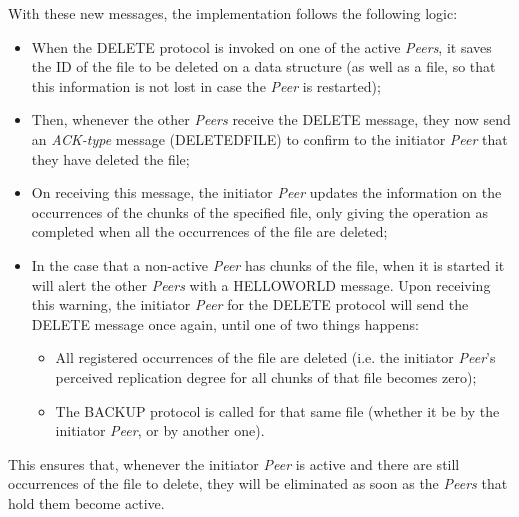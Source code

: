\documentclass[a4paper]{article}
\begin{document}
With these new messages, the implementation follows the following logic:
\begin{itemize}
    \item When the DELETE protocol is invoked on one of the active \textit{Peers}, it saves the 
    ID of the file to be deleted on a data structure (as well as a file, so that this information
    is not lost in case the \textit{Peer} is restarted);
    \item Then, whenever the other \textit{Peers} receive the DELETE message, they now send an 
    \textit{ACK-type} message (DELETEDFILE) to confirm to the initiator \textit{Peer} that they 
    have deleted the file;
    \item On receiving this message, the initiator \textit{Peer} updates the information on the
    occurrences of the chunks of the specified file, only giving the operation as completed when
    all the occurrences of the file are deleted;
    \item In the case that a non-active \textit{Peer} has chunks of the file, when it is started 
    it will alert the other \textit{Peers} with a HELLOWORLD message. Upon receiving this 
    warning, the initiator \textit{Peer} for the DELETE protocol will send the DELETE message 
    once again, until one of two things happens:
    \begin{itemize}
        \item All registered occurrences of the file are deleted (i.e. the initiator 
        \textit{Peer}'s perceived replication degree for all chunks of that file becomes zero);
        \item The BACKUP protocol is called for that same file (whether it be by the initiator 
        \textit{Peer}, or by another one).
    \end{itemize}
\end{itemize}
This ensures that, whenever the initiator \textit{Peer} is active and there are still occurrences of the file to delete,
they will be eliminated as soon as the \textit{Peers} that hold them become active.
\end{document}
